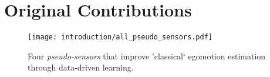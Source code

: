 %
%
% 
 
\section{Original Contributions}

\begin{figure}[h!]
\begin{center}
		\texttt{[image: introduction/all\_pseudo\_sensors.pdf]}
		\caption{Four \textit{pseudo-sensors} that improve 'classical` egomotion estimation through data-driven learning.}
  	\label{fig:intro_pseudo_sensors}
\end{center}
\end{figure}


